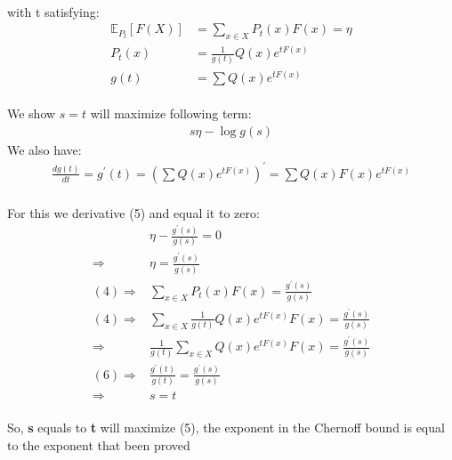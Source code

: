 \documentclass[
  course = {{EE623 Information Theory}},
  quartile = {{4}},
  assignment = 5,
  name = {{Mohammad Mahdi Rahimi}},
  studentnumber = {{20208244}},
  email = {{mahi@kaist.ac.kr}},
  firstexercise = 1
]{aga-homework}
\begin{document}
\newpage
\\
\exercise
\\\\
with t satisfying:
\begin{equation} \label{eq3}
\begin{split}
\mathbb{E}_P_t [F(X)] & = \sum_{x \in X} P_t(x)F(x) = \eta \\
P_t(x) & = \frac{1}{g(t)}Q(x)e^{tF(x)} \\
g(t) & = \sum{Q(x)e^{tF(x)}}
\end{split}
\end{equation}\\
We show $s = t$ will maximize following term:\\
\begin{equation} \label{eq3}
\begin{split}
s\eta - \log{g(s)}
\end{split}
\end{equation}
We also have:
\begin{equation} \label{eq3}
\begin{split}
\frac{dg(t)}{dt} = 
g^{\prime}(t) = (\sum{Q(x)e^{tF(x)}})^{\prime} = \sum{Q(x)F(x)e^{tF(x)}}
\end{split}
\end{equation}\\
For this we derivative (5) and equal it to zero:
\begin{equation} \label{eq3}
\begin{split}
& \eta - \frac{g^{\prime}(s)}{g(s)} = 0 \\
\Rightarrow & \eta = \frac{g^{\prime}(s)}{g(s)} \\
(4) \Rightarrow & \sum_{x \in X} P_t(x)F(x) = \frac{g^{\prime}(s)}{g(s)} \\
(4) \Rightarrow & \sum_{x \in X} \frac{1}{g(t)}Q(x)e^{tF(x)}F(x) = \frac{g^{\prime}(s)}{g(s)} \\
\Rightarrow & \frac{1}{g(t)}\sum_{x \in X} Q(x)e^{tF(x)}F(x) = \frac{g^{\prime}(s)}{g(s)} \\
(6) \Rightarrow & \frac{g^{\prime}(t)}{g(t)} = \frac{g^{\prime}(s)}{g(s)}\\
\Rightarrow & s = t
\end{split}
\end{equation}\\
So, \textbf{s} equals to \textbf{t} will maximize (5), the exponent in the Chernoff bound is equal to the exponent that been proved
\end{document}
